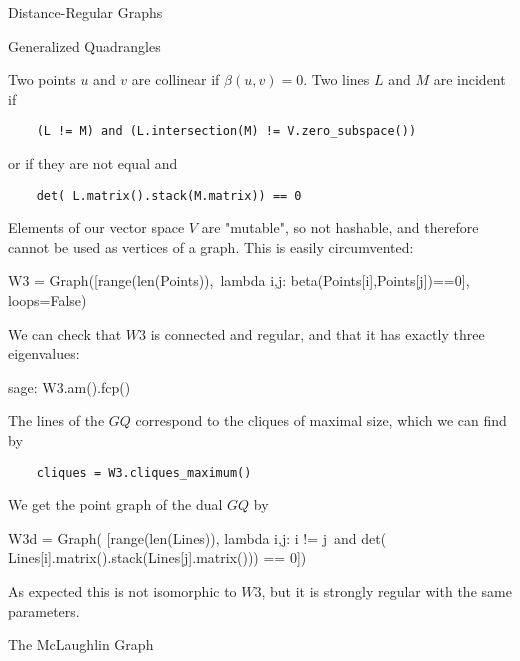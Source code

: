 \begin{chap}{Distance-Regular Graphs}
\begin{sect}{Generalized Quadrangles}
\begin{sageblock}
\end{sageblock}
%
\begin{para}
Two points $u$ and $v$ are collinear if $\beta(u,v)=0$. Two lines $L$ and $M$ 
are incident if
\end{para}
%
\begin{verbatim}
    (L != M) and (L.intersection(M) != V.zero_subspace())
\end{verbatim}
%
\begin{para}
or if they are not equal and
\end{para}
%
\begin{verbatim}
    det( L.matrix().stack(M.matrix)) == 0
\end{verbatim}
%
\begin{para}
Elements of our vector space $V$ are "mutable", so not hashable, 
and therefore cannot be used as vertices of a graph. This is easily circumvented:
\end{para}
%
\begin{sageblock}
W3 = Graph([range(len(Points)),\
   lambda i,j: beta(Points[i],Points[j])==0], loops=False)
\end{sageblock}
%
\begin{para}
We can check that $W3$ is connected and regular, and that it has exactly three
eigenvalues:
\end{para}
%
\begin{sageexample}
    sage: W3.am().fcp()
\end{sageexample}
%
\begin{para}
The lines of the $GQ$ correspond to the cliques of maximal size, which we
can find by
\end{para}
%
\begin{verbatim}
    cliques = W3.cliques_maximum()
\end{verbatim}
%
\begin{para}
We get the point graph of the dual $GQ$ by
\end{para}
%
\begin{sageblock}
W3d = Graph( [range(len(Lines)), lambda i,j: i != j\
    and det( Lines[i].matrix().stack(Lines[j].matrix())) == 0])
\end{sageblock}
%
\begin{para}
As expected this is not isomorphic to $W3$, but it is strongly regular with
the same parameters.
\end{para}
%
\end{sect}
%
\begin{sect}{The McLaughlin Graph}
%
\begin{para}

\end{para}
\end{sect}
\end{chap}

